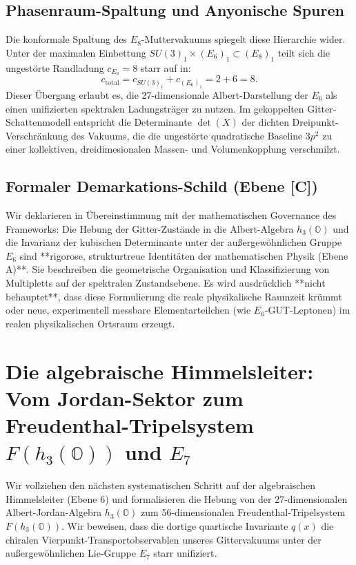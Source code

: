 \documentclass[11pt,a4paper]{article}
\theoremstyle{definition}
\begin{document}
	\subsection{Phasenraum-Spaltung und Anyonische Spuren}
	Die konformale Spaltung des $E_8$-Muttervakuums spiegelt diese Hierarchie wider. Unter der maximalen Einbettung $SU(3)_1 \times (E_6)_1 \subset (E_8)_1$ teilt sich die ungestörte Randladung $c_{E_8} = 8$ starr auf in:
	\begin{equation}
		c_{\text{total}} = c_{SU(3)_1} + c_{(E_6)_1} = 2 + 6 = 8.
	\end{equation}
	Dieser Übergang erlaubt es, die 27-dimensionale Albert-Darstellung der $E_6$ als einen unifizierten spektralen Ladungsträger zu nutzen. Im gekoppelten Gitter-Schattenmodell entspricht die Determinante $\det(X)$ der dichten Dreipunkt-Verschränkung des Vakuums, die die ungestörte quadratische Baseline $3p^2$ zu einer kollektiven, dreidimesionalen Massen- und Volumenkopplung verschmilzt.
	
	\subsection{Formaler Demarkations-Schild (Ebene [C])}
	Wir deklarieren in Übereinstimmung mit der mathematischen Governance des Frameworks:
	Die Hebung der Gitter-Zustände in die Albert-Algebra $h_3(\mathbb{O})$ und die Invarianz der kubischen Determinante unter der außergewöhnlichen Gruppe $E_6$ sind **rigorose, strukturtreue Identitäten der mathematischen Physik (Ebene A)**. Sie beschreiben die geometrische Organisation und Klassifizierung von Multipletts auf der spektralen Zustandsebene. Es wird ausdrücklich **nicht behauptet**, dass diese Formulierung die reale physikalische Raumzeit krümmt oder neue, experimentell messbare Elementarteilchen (wie $E_6$-GUT-Leptonen) im realen physikalischen Ortsraum erzeugt.
	
	
	\section{Die algebraische Himmelsleiter: Vom Jordan-Sektor zum Freudenthal-Tripelsystem $F(h_3(\mathbb{O}))$ und $E_7$}
	\label{sec:jordan_freudenthal_e7_bridge}
	
	Wir vollziehen den nächsten systematischen Schritt auf der algebraischen Himmelsleiter (Ebene 6) und formalisieren die Hebung von der 27-dimensionalen Albert-Jordan-Algebra $h_3(\mathbb{O})$ zum 56-dimensionalen Freudenthal-Tripelsystem $F(h_3(\mathbb{O}))$. Wir beweisen, dass die dortige quartische Invariante $q(x)$ die chiralen Vierpunkt-Transportobservablen unseres Gittervakuums unter der außergewöhnlichen Lie-Gruppe $E_7$ starr unifiziert.
	
\end{document}
